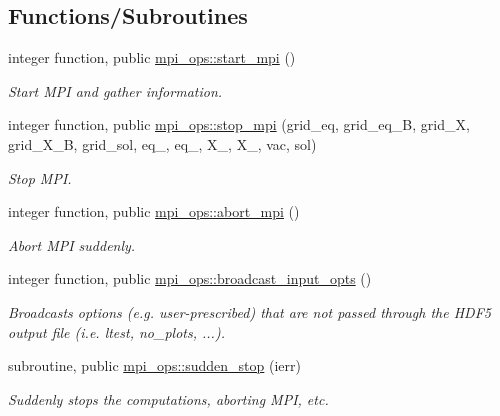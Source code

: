 \subsection*{Functions/\+Subroutines}
\begin{DoxyCompactItemize}
\item 
integer function, public \hyperlink{namespacempi__ops_a804ec65ff711509de1f8873f97bdf967}{mpi\+\_\+ops\+::start\+\_\+mpi} ()
\begin{DoxyCompactList}\small\item\em Start M\+PI and gather information. \end{DoxyCompactList}\item 
integer function, public \hyperlink{namespacempi__ops_a9dcb5624e665c9e15a4203edb5f44b0f}{mpi\+\_\+ops\+::stop\+\_\+mpi} (grid\+\_\+eq, grid\+\_\+eq\+\_\+B, grid\+\_\+X, grid\+\_\+\+X\+\_\+B, grid\+\_\+sol, eq\+\_, eq\+\_, X\+\_, X\+\_, vac, sol)
\begin{DoxyCompactList}\small\item\em Stop M\+PI. \end{DoxyCompactList}\item 
integer function, public \hyperlink{namespacempi__ops_a54d9258ef985728345579e8e57dc8dfe}{mpi\+\_\+ops\+::abort\+\_\+mpi} ()
\begin{DoxyCompactList}\small\item\em Abort M\+PI suddenly. \end{DoxyCompactList}\item 
integer function, public \hyperlink{namespacempi__ops_a932eba1c998dd7a0f1191b55cd754be3}{mpi\+\_\+ops\+::broadcast\+\_\+input\+\_\+opts} ()
\begin{DoxyCompactList}\small\item\em Broadcasts options (e.\+g. user-\/prescribed) that are not passed through the H\+D\+F5 output file (i.\+e. {\ttfamily ltest}, {\ttfamily no\+\_\+plots}, ...). \end{DoxyCompactList}\item 
subroutine, public \hyperlink{namespacempi__ops_a40e8610357a9a5b075fef9dab1c3f24f}{mpi\+\_\+ops\+::sudden\+\_\+stop} (ierr)
\begin{DoxyCompactList}\small\item\em Suddenly stops the computations, aborting M\+PI, etc. \end{DoxyCompactList}\end{DoxyCompactItemize}
